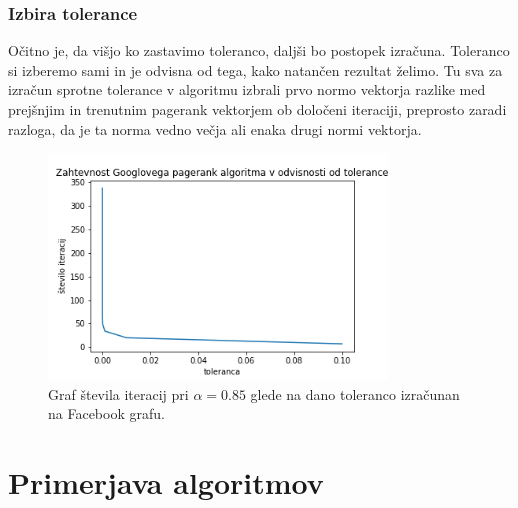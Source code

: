 \documentclass[a4paper]{article}
\begin{document}
\subsubsection{Izbira tolerance} 
\hspace{4.8mm}Očitno je, da višjo ko zastavimo toleranco, daljši bo postopek izračuna. Toleranco si izberemo sami in je odvisna od tega, kako natančen rezultat želimo. Tu sva za izračun sprotne tolerance v algoritmu izbrali prvo normo vektorja razlike med prejšnjim in trenutnim pagerank vektorjem ob določeni iteraciji, preprosto zaradi razloga, da je ta norma vedno večja ali enaka drugi normi vektorja. \\
\begin{figure}[h]
\begin{center} 
\includegraphics[width=9cm]{Pagerank_tolerance.png}
	\caption[Zahtevnost Googlovega pagerank algoritma glede na toleranco]{Graf števila iteracij pri $\alpha = 0.85$ glede na dano toleranco izračunan na Facebook grafu.}
\end{center}
\end{figure}





\section{Primerjava algoritmov}
\end{document}
